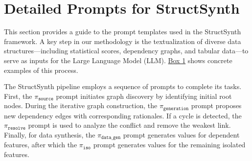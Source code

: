 

\section{Detailed Prompts for StructSynth}
\label{app:prompts}
This section provides a guide to the prompt templates used in the StructSynth framework. A key step in our methodology is the textualization of diverse data structures---including statistical scores, dependency graphs, and tabular data---to serve as inputs for the Large Language Model (LLM). \hyperref[box:textualization_examples]{Box 1} shows concrete examples of this process. 

The StructSynth pipeline employs a sequence of prompts to complete its tasks. First, the \hyperref[prompt:source]{\texttt{$\pi_\mathtt{source}$}} prompt initiates graph discovery by identifying initial root nodes. During the iterative graph construction, the \hyperref[prompt:generation]{\texttt{$\pi_\mathtt{generation}$}} prompt proposes new dependency edges with corresponding rationales. If a cycle is detected, the \hyperref[prompt:resolve]{\texttt{$\pi_\mathtt{resolve}$}} prompt is used to analyze the conflict and remove the weakest link. Finally, for data synthesis, the \hyperref[prompt:data_gen]{\texttt{$\pi_\mathtt{data\_gen}$}} prompt generates values for dependent features, after which the \hyperref[prompt:data_gen_iso]{\texttt{$\pi_\mathtt{iso}$}} prompt generates values for the remaining isolated features.


